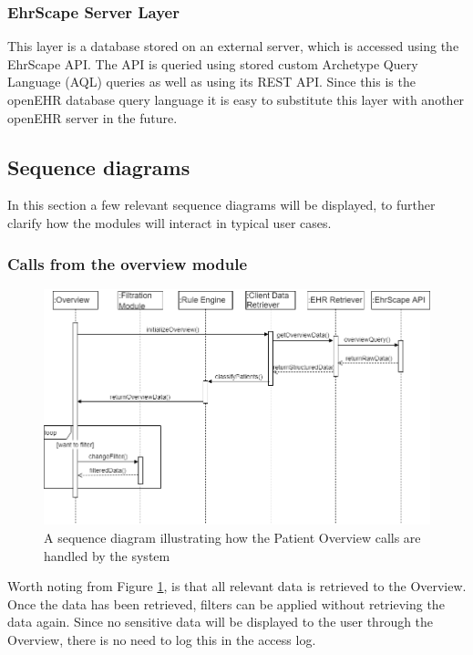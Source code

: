 \documentclass{article}
\begin{document}
\subsubsection{EhrScape Server Layer}
This layer is a database stored on an external server, which is accessed using the EhrScape API. The API is queried using stored custom Archetype Query Language (AQL) queries as well as using its REST API. Since this is the openEHR database query language it is easy to substitute this layer with another openEHR server in the future.

\subsection{Sequence diagrams}
In this section a few relevant sequence diagrams will be displayed, to further clarify how the modules will interact in typical user cases.

\subsubsection{Calls from the overview module}
\begin{figure}[h]
    \centering
    \includegraphics[scale = 0.45]{overview-sequence}
    \caption{A sequence diagram illustrating how the Patient Overview calls are handled by the system}
    \label{fig:overview-sequence}
\end{figure}

Worth noting from Figure \ref{fig:overview-sequence}, is that all relevant data is retrieved to the Overview. Once the data has been retrieved, filters can be applied without retrieving the data again. Since no sensitive data will be displayed to the user through the Overview, there is no need to log this in the access log.
\end{document}
